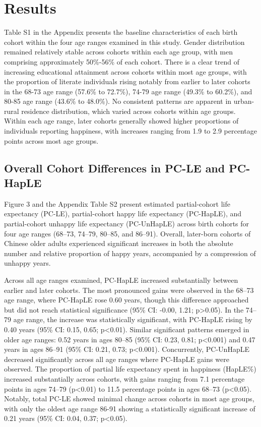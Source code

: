 \documentclass[12pt, a4paper]{article}
\begin{document}
\section{Results}
Table S1 in the Appendix presents the baseline characteristics of each birth cohort within the four age ranges examined in this study. Gender distribution remained relatively stable across cohorts within each age group, with men comprising approximately 50\%-56\% of each cohort. There is a clear trend of increasing educational attainment across cohorts within most age groups, with the proportion of literate individuals rising notably from earlier to later cohorts in the 68-73 age range (57.6\% to 72.7\%), 74-79 age range (49.3\% to 60.2\%), and 80-85 age range (43.6\% to 48.0\%). No consistent patterns are apparent in urban-rural residence distribution, which varied across cohorts within age groups. Within each age range, later cohorts generally showed higher proportions of individuals reporting happiness, with increases ranging from 1.9 to 2.9 percentage points across most age groups.

\subsection{Overall Cohort Differences in PC-LE and PC-HapLE}

Figure 3 and the Appendix Table S2 present estimated partial-cohort life expectancy (PC-LE), partial-cohort happy life expectancy (PC-HapLE), and partial-cohort unhappy life expectancy (PC-UnHapLE) across birth cohorts for four age ranges (68–73, 74–79, 80–85, and 86–91). Overall, later-born cohorts of Chinese older adults experienced significant increases in both the absolute number and relative proportion of happy years, accompanied by a compression of unhappy years.

Across all age ranges examined, PC-HapLE increased substantially between earlier and later cohorts. The most pronounced gains were observed in the 68–73 age range, where PC-HapLE rose 0.60 years, though this difference approached but did not reach statistical significance (95\% CI: -0.00, 1.21; p>0.05). In the 74–79 age range, the increase was statistically significant, with PC-HapLE rising by 0.40 years (95\% CI: 0.15, 0.65; p<0.01). Similar significant patterns emerged in older age ranges: 0.52 years in ages 80–85 (95\% CI: 0.23, 0.81; p<0.001) and 0.47 years in ages 86–91 (95\% CI: 0.21, 0.73; p<0.001). Concurrently, PC-UnHapLE decreased significantly across all age ranges where PC-HapLE gains were observed. The proportion of partial life expectancy spent in happiness (HapLE\%) increased substantially across cohorts, with gains ranging from 7.1 percentage points in ages 74–79 (p<0.01) to 11.5 percentage points in ages 68–73 (p<0.05). Notably, total PC-LE showed minimal change across cohorts in most age groups, with only the oldest age range 86-91 showing a statistically significant increase of 0.21 years (95\% CI: 0.04, 0.37; p<0.05).
\end{document}
